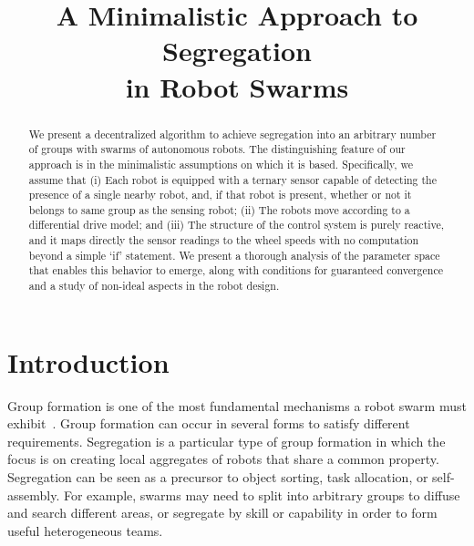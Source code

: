 \documentclass[conference]{IEEEtran}
\begin{document}
\title{A Minimalistic Approach to Segregation\\
  in Robot Swarms}

\author{
}

\maketitle

\begin{abstract}
  We present a decentralized algorithm to achieve segregation into an arbitrary
  number of groups with swarms of autonomous robots. The distinguishing feature
  of our approach is in the minimalistic assumptions on which it is
  based. Specifically, we assume that (i) Each robot is equipped with a ternary
  sensor capable of detecting the presence of a single nearby robot, and, if
  that robot is present, whether or not it belongs to same group as the sensing
  robot; (ii) The robots move according to a differential drive model; and (iii)
  The structure of the control system is purely reactive, and it maps directly
  the sensor readings to the wheel speeds with no computation beyond a simple
  `if' statement. We present a thorough analysis of the parameter space that
  enables this behavior to emerge, along with conditions for guaranteed
  convergence and a study of non-ideal aspects in the robot design.
\end{abstract}


\section{Introduction}

Group formation is one of the most fundamental mechanisms a robot swarm must
exhibit~\cite{Brambilla2013}. Group formation can occur in several forms to
satisfy different requirements. Segregation is a particular type of group
formation in which the focus is on creating local aggregates of robots that
share a common property. Segregation can be seen as a precursor to object
sorting, task allocation, or self-assembly. For example, swarms may need to
split into arbitrary groups to diffuse and search different areas, or segregate
by skill or capability in order to form useful heterogeneous teams.
\end{document}
